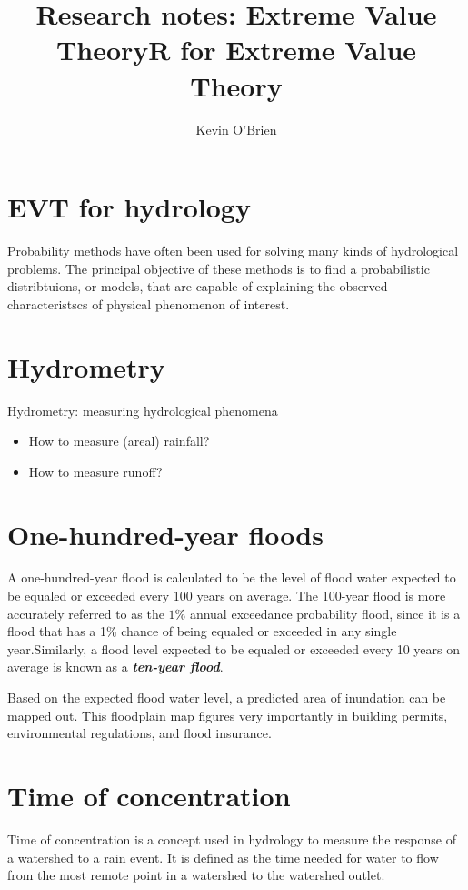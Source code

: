 \documentclass[12pt, a4paper]{article}
\title{Research notes: Extreme Value Theory}
\author{ } \date{ }
\theoremstyle{plain}
\theoremstyle{definition}
\theoremstyle{remark}
\begin{document}
\author{Kevin O'Brien}
\title{R for Extreme Value Theory}


\section{EVT for hydrology}
Probability methods have often been used for solving many kinds of hydrological problems. The principal objective of these methods is to find a probabilistic distribtuions, or models, that are capable of explaining the observed  characteristscs of physical phenomenon of interest.


\section{Hydrometry}
Hydrometry: measuring hydrological phenomena
\begin{itemize}
\item How to measure (areal) rainfall?
\item How to measure runoff?
\end{itemize}


\section{One-hundred-year floods }
A one-hundred-year flood is calculated to be the level of flood water expected to be equaled or exceeded every 100 years on average. The 100-year flood is more accurately referred to as the $1\%$ annual exceedance probability flood, since it is a flood that has a 1\% chance of being equaled or exceeded in any single
year.Similarly, a flood level expected to be equaled or exceeded every 10 years on average is known as a \textbf{\emph{ten-year
flood}}.

Based on the expected flood water level, a predicted area of inundation can be mapped out. This floodplain map figures very
importantly in building permits, environmental regulations, and flood insurance.

\section{Time of concentration}
Time of concentration is a concept used in hydrology to measure the response of a watershed to a rain event. It is defined as the
time needed for water to flow from the most remote point in a watershed to the watershed outlet.
\end{document}
